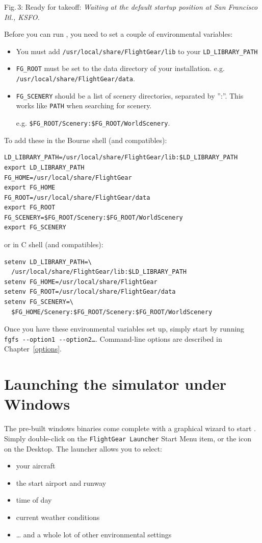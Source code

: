  \noindent
Fig.\,3: Ready for takeoff: \textit{Waiting at the default startup position at San
Francisco Itl., KSFO.}
\medskip

Before you can run \FlightGear{}, you need to set a couple of environmental variables:

\begin{itemize}
\item You must add \texttt{/usr/local/share/FlightGear/lib} to your \texttt{LD\_LIBRARY\_PATH}
\item \texttt{FG\_ROOT} must be set to the data directory of your \FlightGear{} installation. e.g. \texttt{/usr/local/share/FlightGear/data}.
\item \texttt{FG\_SCENERY} should be a list of scenery directories, separated by '':''. This works like \texttt{PATH} when searching for scenery.

e.g. \texttt{\$FG\_ROOT/Scenery:\$FG\_ROOT/WorldScenery}.
\end{itemize}

\noindent
To add these in the Bourne shell (and compatibles):
\begin{verbatim}
LD_LIBRARY_PATH=/usr/local/share/FlightGear/lib:$LD_LIBRARY_PATH
export LD_LIBRARY_PATH
FG_HOME=/usr/local/share/FlightGear
export FG_HOME
FG_ROOT=/usr/local/share/FlightGear/data
export FG_ROOT
FG_SCENERY=$FG_ROOT/Scenery:$FG_ROOT/WorldScenery
export FG_SCENERY
\end{verbatim}
\noindent
 or in C shell (and compatibles):
\begin{verbatim}
setenv LD_LIBRARY_PATH=\
  /usr/local/share/FlightGear/lib:$LD_LIBRARY_PATH
setenv FG_HOME=/usr/local/share/FlightGear
setenv FG_ROOT=/usr/local/share/FlightGear/data
setenv FG_SCENERY=\
  $FG_HOME/Scenery:$FG_ROOT/Scenery:$FG_ROOT/WorldScenery
\end{verbatim}
Once you have these environmental variables set up, simply start \FlightGear{} by running
\texttt{fgfs -$ $-option1 -$ $-option2\dots}.
\medskip
Command-line options are described in Chapter~\ref{options}.

\section{Launching the simulator under Windows}
The pre-built windows binaries come complete with a graphical wizard to start \FlightGear{}. Simply double-click on the \texttt{FlightGear Launcher} Start Menu item, or the icon on the Desktop. The launcher allows you to select:
\begin{itemize}
\item your aircraft
\item the start airport and runway
\item time of day
\item current weather conditions
\item \dots{} and a whole lot of other environmental settings
\end{itemize}

